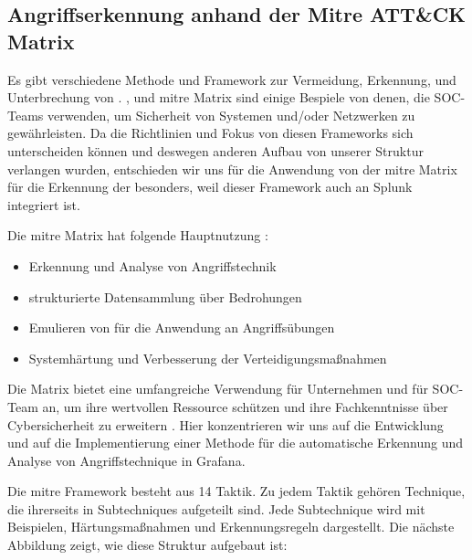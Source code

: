 \subsection{Angriffserkennung anhand der Mitre ATT\&CK Matrix\textregistered}
Es gibt verschiedene Methode und Framework zur Vermeidung, Erkennung, und Unterbrechung von . ,  und \gls{mitre} Matrix sind einige Bespiele von denen, die \gls{SOC}-Teams verwenden, um Sicherheit von Systemen und/oder Netzwerken zu gewährleisten. Da die Richtlinien und Fokus von diesen Frameworks sich unterscheiden können und deswegen anderen Aufbau von unserer Struktur verlangen wurden, entschieden wir uns für die Anwendung von der \gls{mitre} Matrix für die Erkennung der  besonders, weil dieser Framework auch an Splunk integriert ist.

\newpage
Die \gls{mitre} Matrix hat folgende Hauptnutzung \citep{Mitre_Started}:

\begin{itemize}[noitemsep]
   \item Erkennung und Analyse von Angriffstechnik
   \item	strukturierte Datensammlung über Bedrohungen
   \item	Emulieren von  für die Anwendung an Angriffsübungen
   \item	Systemhärtung und Verbesserung der Verteidigungsmaßnahmen
\end{itemize}

Die Matrix bietet eine umfangreiche Verwendung für Unternehmen und für \gls{SOC}-Team an, um ihre wertvollen Ressource schützen und ihre Fachkenntnisse über \gls{Cybersicherheit} zu erweitern \citep{Hazel_howtousemitre}. Hier konzentrieren wir uns auf die Entwicklung und auf die Implementierung einer Methode für die automatische Erkennung und Analyse von Angriffstechnique in Grafana.

Die \gls{mitre} Framework besteht aus 14 Taktik. Zu jedem Taktik gehören Technique, die ihrerseits in Subtechniques aufgeteilt sind. Jede Subtechnique wird mit Beispielen, Härtungsmaßnahmen und Erkennungsregeln dargestellt. Die nächste Abbildung zeigt, wie diese Struktur aufgebaut ist: 

